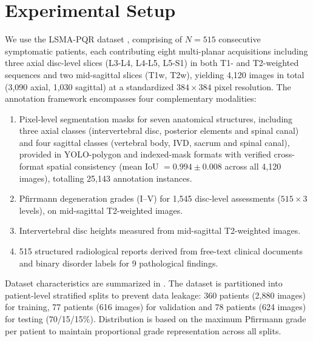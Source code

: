 \documentclass[journal]{IEEEtran}
\begin{document}



\section{Experimental Setup}
\label{sec:experiments}




We use the LSMA-PQR dataset \cite{masood_lsma_pqr_2025}, comprising of $N=515$ consecutive symptomatic patients, each contributing eight multi-planar acquisitions including three axial disc-level slices (L3-L4, L4-L5, L5-S1) in both T1- and T2-weighted sequences and two mid-sagittal slices (T1w, T2w), yielding 4,120 images in total (3,090 axial, 1,030 sagittal) at a standardized $384{\times}384$ pixel resolution. The annotation framework encompasses four complementary modalities:
\begin{enumerate}[label=(\roman*)]
    \item Pixel-level segmentation masks for seven anatomical structures, including three axial classes (intervertebral disc, posterior elements and spinal canal) and four sagittal classes (vertebral body, IVD, sacrum and spinal canal), provided in YOLO-polygon and indexed-mask formats with verified cross-format spatial consistency (mean IoU $= 0.994 \pm 0.008$ across all 4,120 images), totalling 25,143 annotation instances.
    \item Pfirrmann degeneration grades (I--V) for 1,545 disc-level assessments ($515 \times 3$ levels), on mid-sagittal T2-weighted images.
    \item Intervertebral disc heights measured from mid-sagittal T2-weighted images.
    \item 515 structured radiological reports derived from free-text clinical documents and binary disorder labels for 9 pathological findings.
\end{enumerate}

Dataset characteristics are summarized in . The dataset is partitioned into patient-level stratified splits to prevent data leakage: 360 patients (2,880 images) for training, 77 patients (616 images) for validation and 78 patients (624 images) for testing (70/15/15\%). Distribution is based on the maximum Pfirrmann grade per patient to maintain proportional grade representation across all splits.
\end{document}
